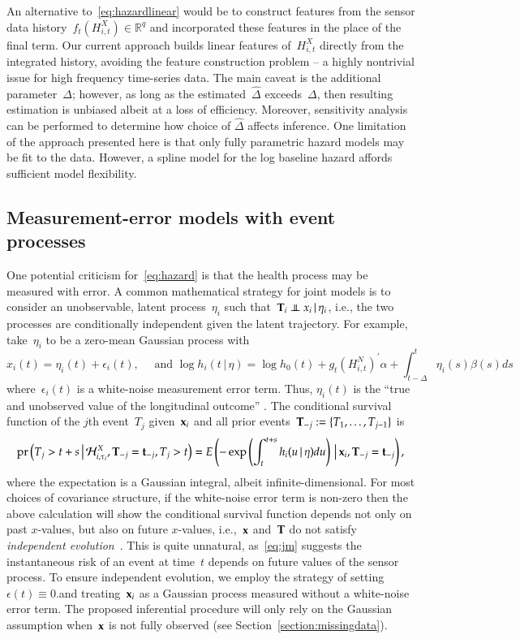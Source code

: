 \documentclass[11pt]{amsart}
\def\pr{\mathop{\text{pr}}\nolimits}
\def\pr{\mathop{\text{pr}}\nolimits}
\def\indep{\mathrel{\rlap{$\perp$}\kern1.6pt\mathord{\perp}}}
\def\H{\mathcal{H}}
\def\given{\, | \,}
\def\Given{\, \big | \,}
\def\bft{{\bf t}}
\def\bfx{{\bf x}}
\def\bfT{{\bf T}}
\begin{document}
An alternative to~\eqref{eq:hazardlinear} would be to construct features from the sensor data history~$f_t ( H_{i,t}^{X}) \in \mathbb{R}^q$ and incorporated these features in the place of the final term. Our current approach builds linear features of~$H_{i,t}^X$ directly from the integrated history, avoiding the feature construction problem -- a highly nontrivial issue for high frequency time-series data.  The main caveat is the additional parameter~$\Delta$; however, as long as the estimated~$\hat \Delta$ exceeds~$\Delta$, then resulting estimation is unbiased albeit at a loss of efficiency.  Moreover, sensitivity analysis can be performed to determine how choice of $\hat \Delta$ affects inference.  One limitation of the approach presented here is that only fully parametric hazard models may be fit to the data. However, a spline model for the log baseline hazard affords sufficient model flexibility.

\subsection{Measurement-error models with event processes}
\label{section:memproblems}

One potential criticism for~\eqref{eq:hazard} is that the health process may be measured with error. A common mathematical strategy for joint models is to consider an unobservable, latent process~$\eta_i$ such that~$\bfT_i \indep x_i \given \eta_i$, i.e., the two processes are conditionally independent given the latent trajectory. For example, take~$\eta_i$ to be a zero-mean Gaussian process with
\begin{equation}\label{eq:jm}
x_i(t) = \eta_i (t) + \epsilon_i (t),\quad \text{ and } \log h_i (t
\given \eta ) = \log h_0 (t) + g_t \left( H_{i,t}^N \right)^{\prime}
\alpha + \int_{t-\Delta}^t \eta_i (s) \beta (s) ds
\end{equation}
where~$\epsilon_i(t)$ is a white-noise measurement error term. Thus, $\eta_i (t)$ is the ``true and unobserved value of the longitudinal outcome'' \citep[Sec. 2.1, pp.3]{Rizopoulos2010}. The conditional survival function of the $j$th event~$T_j$ given~$\bfx_i$ and all prior events~$\bfT_{-j} := \{ T_1, \ldots, T_{j-1} \}$ is
\[
\pr \left ( T_j > t+s \Given \H_{i,\tau_i}^X, \bfT_{-j} = \bft_{-j}, T_j > t \right) = E \left( - \exp \left( \int_{t}^{t+s} h_i (u \given \eta ) du \right) \Given \bfx_i, \bfT_{-j} = \bft_{-j} \right),
\]
where the expectation is a Gaussian integral, albeit infinite-dimensional.  For most choices of covariance structure, if the white-noise error term is non-zero then the above calculation will show the conditional survival function depends not only on past $x$-values, but also on future $x$-values, i.e.,~$\bfx$ and~$\bfT$ do not satisfy \emph{independent evolution}~\citep{DempseyPMCC2}. This is quite unnatural, as~\eqref{eq:jm} suggests the instantaneous risk of an event at time~$t$ depends on future values of the sensor process. To ensure independent evolution, we employ the strategy of setting~$\epsilon (t) \equiv 0$.and treating~$\bfx_i$ as a Gaussian process measured without a white-noise error term. The proposed inferential procedure will only rely on the Gaussian assumption when~$\bfx$ is not fully observed (see Section~\ref{section:missingdata}).
\end{document}
